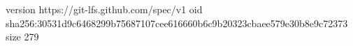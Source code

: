 version https://git-lfs.github.com/spec/v1
oid sha256:30531d9c6468299b75687107cee616660b6c9b20323cbaee579e30b8e9c72373
size 279
